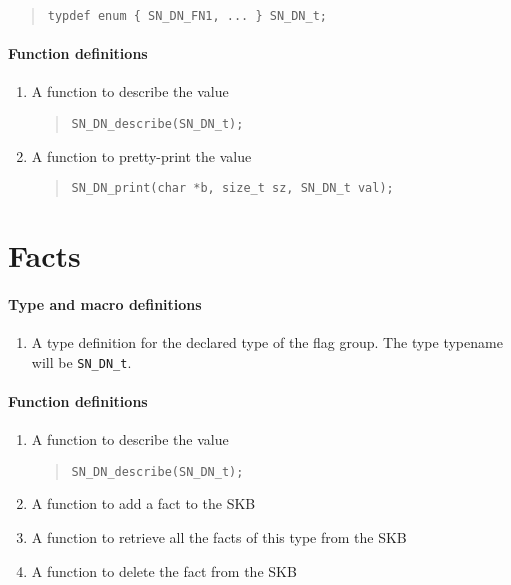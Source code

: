 \documentclass[a4paper,11pt,twoside]{report}
\begin{document}
{{\begin{quote}
  \texttt{typdef enum \{ SN\_DN\_FN1, ... \} SN\_DN\_t; }
\end{quote}

\paragraph{Function definitions}
\begin{enumerate}
  \item A function to describe the value 
        \begin{quote}
          \texttt{SN\_DN\_describe(SN\_DN\_t);}
        \end{quote}
  \item A function to pretty-print the value
        \begin{quote}
          \texttt{SN\_DN\_print(char *b, size\_t sz, SN\_DN\_t val);}
        \end{quote}
\end{enumerate}

\section{Facts}


\paragraph{Type and macro definitions}
\begin{enumerate}
  \item A type definition for the declared type of the flag group. The 
        type typename will be \texttt{SN\_DN\_t}.
\end{enumerate}

\paragraph{Function definitions}
\begin{enumerate}
  \item A function to describe the value 
        \begin{quote}
          \texttt{SN\_DN\_describe(SN\_DN\_t);}
        \end{quote}
  \item A function to add a fact to the SKB
  \item A function to retrieve all the facts of this type from the SKB
  \item A function to delete the fact from the SKB
\end{enumerate}

}}
\end{document}
